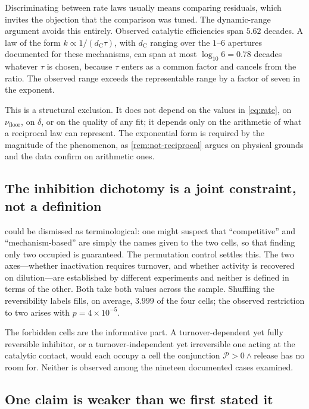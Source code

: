 \documentclass[11pt,twocolumn,a4paper]{article}
\theoremstyle{plain}
\theoremstyle{definition}
\theoremstyle{remark}
\newcommand{\dC}{d_{\mathrm{C}}}
\newcommand{\nufloor}{\nu_{\mathrm{floor}}}
\newcommand{\prov}{\mathcal{P}}
\begin{document}
Discriminating between rate laws usually means comparing residuals, which
invites the objection that the comparison was tuned. The dynamic-range
argument avoids this entirely. Observed catalytic efficiencies span $5.62$
decades. A law of the form $k \propto 1/(\dC\tau)$, with $\dC$ ranging over the
$1$--$6$ apertures documented for these mechanisms, can span at most
$\log_{10} 6 = 0.78$ decades whatever $\tau$ is chosen, because $\tau$ enters
as a common factor and cancels from the ratio. The observed range exceeds the
representable range by a factor of seven in the exponent.

This is a structural exclusion. It does not depend on the values in
\cref{eq:rate}, on $\nufloor$, on $\delta$, or on the quality of any fit; it
depends only on the arithmetic of what a reciprocal law can represent. The
exponential form is required by the magnitude of the phenomenon, as
\cref{rem:not-reciprocal} argues on physical grounds and the data confirm on
arithmetic ones.

\subsection{The inhibition dichotomy is a joint constraint, not a definition}

 could be dismissed as terminological: one might suspect
that ``competitive'' and ``mechanism-based'' are simply the names given to the
two cells, so that finding only two occupied is guaranteed. The permutation
control settles this. The two axes---whether inactivation requires turnover,
and whether activity is recovered on dilution---are established by different
experiments and neither is defined in terms of the other. Both take both
values across the sample. Shuffling the reversibility labels fills, on
average, $3.999$ of the four cells; the observed restriction to two arises
with $p = 4\times10^{-5}$.

The forbidden cells are the informative part. A turnover-dependent yet fully
reversible inhibitor, or a turnover-independent yet irreversible one acting at
the catalytic contact, would each occupy a cell the conjunction
$\prov>0 \wedge \text{release}$ has no room for. Neither is observed among the
nineteen documented cases examined.

\subsection{One claim is weaker than we first stated it}
\end{document}
